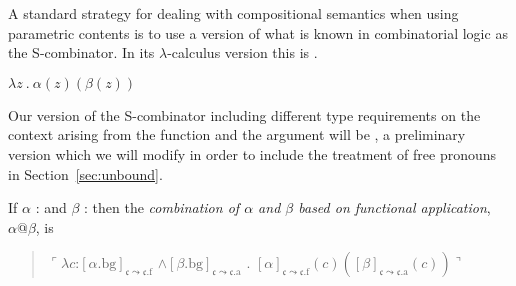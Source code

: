 A standard strategy for dealing with compositional semantics when
using parametric contents is to use a version of what is known in
combinatorial logic as the S-combinator.  In its $\lambda$-calculus
version this is \nexteg{}.
\begin{ex} 
$\lambda z\ .\ \alpha(z)(\beta(z))$ 
\end{ex} 
Our version of the S-combinator including different type requirements
on the context arising from the function and the argument will be
\nexteg{}, a preliminary version which we will modify in order to
include the treatment of free pronouns in Section~\ref{sec:unbound}.
\begin{ex}
If $\alpha$ :  
and $\beta$ : 
                         then the \textit{combination of $\alpha$ and
    $\beta$  based on functional application}, $\alpha\text{@}\beta$, is
\begin{quote}
  $\ulcorner\lambda c$:$[\alpha.\text{bg}]_{\mathfrak{c}\leadsto\mathfrak{c}.\text{f}}$
      \d{$\wedge$}$[\beta.\text{bg}]_{\mathfrak{c}\leadsto\mathfrak{c}.\text{a}}$
      . $[\alpha]_{\mathfrak{c}\leadsto\mathfrak{c}.\text{f}}(c)([\beta]_{\mathfrak{c}\leadsto\mathfrak{c}.\text{a}}(c))\urcorner$
      
\end{quote}
\label{ex:s-combination-prelim}
\end{ex}

